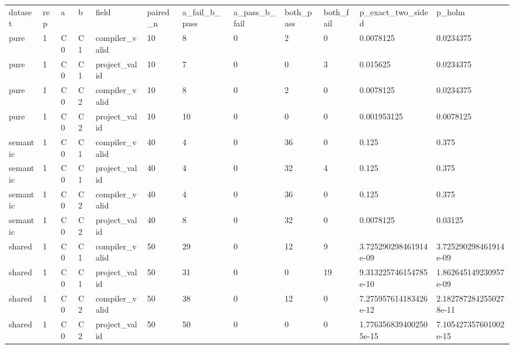 \begin{tabular}{llllllllllll}
dataset & rep & a & b & field & paired\_n & a\_fail\_b\_pass & a\_pass\_b\_fail & both\_pass & both\_fail & p\_exact\_two\_sided & p\_holm \\
pure & 1 & C0 & C1 & compiler\_valid & 10 & 8 & 0 & 2 & 0 & 0.0078125 & 0.0234375 \\
pure & 1 & C0 & C1 & project\_valid & 10 & 7 & 0 & 0 & 3 & 0.015625 & 0.0234375 \\
pure & 1 & C0 & C2 & compiler\_valid & 10 & 8 & 0 & 2 & 0 & 0.0078125 & 0.0234375 \\
pure & 1 & C0 & C2 & project\_valid & 10 & 10 & 0 & 0 & 0 & 0.001953125 & 0.0078125 \\
semantic & 1 & C0 & C1 & compiler\_valid & 40 & 4 & 0 & 36 & 0 & 0.125 & 0.375 \\
semantic & 1 & C0 & C1 & project\_valid & 40 & 4 & 0 & 32 & 4 & 0.125 & 0.375 \\
semantic & 1 & C0 & C2 & compiler\_valid & 40 & 4 & 0 & 36 & 0 & 0.125 & 0.375 \\
semantic & 1 & C0 & C2 & project\_valid & 40 & 8 & 0 & 32 & 0 & 0.0078125 & 0.03125 \\
shared & 1 & C0 & C1 & compiler\_valid & 50 & 29 & 0 & 12 & 9 & 3.725290298461914e-09 & 3.725290298461914e-09 \\
shared & 1 & C0 & C1 & project\_valid & 50 & 31 & 0 & 0 & 19 & 9.313225746154785e-10 & 1.862645149230957e-09 \\
shared & 1 & C0 & C2 & compiler\_valid & 50 & 38 & 0 & 12 & 0 & 7.275957614183426e-12 & 2.1827872842550278e-11 \\
shared & 1 & C0 & C2 & project\_valid & 50 & 50 & 0 & 0 & 0 & 1.7763568394002505e-15 & 7.105427357601002e-15 \\
\end{tabular}